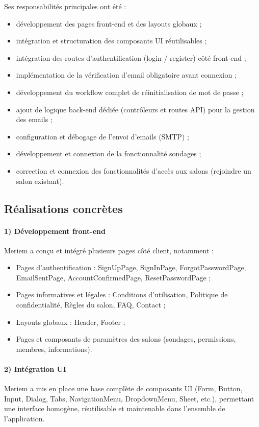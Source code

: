 \documentclass[12pt,a4paper]{report}
\begin{document}
Ses responsabilités principales ont été :
\begin{itemize}
  \item développement des pages front-end et des layouts globaux ;
  \item intégration et structuration des composants UI réutilisables ;
  \item intégration des routes d’authentification (login / register) côté front-end ;
  \item implémentation de la vérification d’email obligatoire avant connexion ;
  \item développement du workflow complet de réinitialisation de mot de passe ;
  \item ajout de logique back-end dédiée (contrôleurs et routes API) pour la gestion des emails ;
  \item configuration et débogage de l’envoi d’emails (SMTP) ;
  \item développement et connexion de la fonctionnalité sondages ;
  \item correction et connexion des fonctionnalités d’accès aux salons (rejoindre un salon existant).
\end{itemize}

\subsection*{Réalisations concrètes}

\paragraph{1) Développement front-end}
Meriem a conçu et intégré plusieurs pages côté client, notamment :
\begin{itemize}
  \item Pages d’authentification : SignUpPage, SignInPage, ForgotPasswordPage, EmailSentPage, AccountConfirmedPage, ResetPasswordPage ;
  \item Pages informatives et légales : Conditions d’utilisation, Politique de confidentialité, Règles du salon, FAQ, Contact ;
  \item Layouts globaux : Header, Footer ;
  \item Pages et composants de paramètres des salons (sondages, permissions, membres, informations).
\end{itemize}

\paragraph{2) Intégration UI}
Meriem a mis en place une base complète de composants UI (Form, Button, Input, Dialog, Tabs, NavigationMenu, DropdownMenu, Sheet, etc.), permettant une interface homogène, réutilisable et maintenable dans l’ensemble de l’application.
\end{document}
